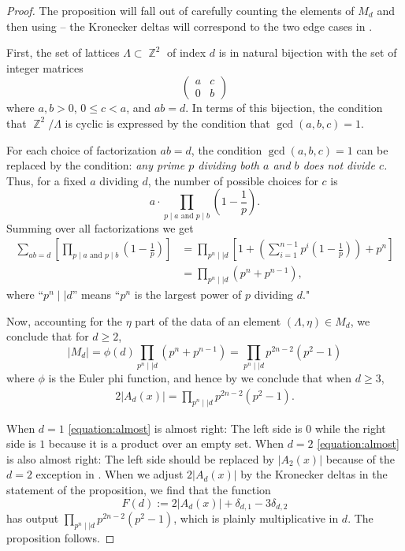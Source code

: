 \documentclass[reqno, 11pt]{amsart}
\DeclareMathOperator{\Z}{\mathbb{Z}}
\begin{document}
\begin{proof}
    The proposition will fall out of carefully counting the elements of $M_{d}$ and then using  -- the Kronecker deltas will correspond to the two edge cases in . 
    
    First, the set of lattices $\Lambda \subset \Z^{2}$ of index $d$ is in natural bijection with the set of integer matrices \[\begin{pmatrix}
        a & c \\
        0 & b
    \end{pmatrix}\] where $a,b > 0$, $0 \leq c < a$, and $ab=d$. In terms of this bijection, the condition that $\Z^{2}/\Lambda$ is cyclic is expressed by the condition that $\gcd(a,b,c)=1$. 

    For each choice of factorization $ab=d$, the condition $\gcd(a,b,c)=1$ can be replaced by the condition: \emph{any prime $p$ dividing both $a$ and $b$ does not divide $c$.} Thus, for a fixed $a$ dividing $d$, the number of possible choices for $c$ is \[ a \cdot \prod_{p \mid a \,\, \text{and} \,\, p \mid b}\left(1 - \frac{1}{p} \right).\] Summing over all factorizations we get 
    \begin{align*}
    \sum_{ab=d}\left[ \prod_{p \mid a \,\, \text{and} \,\, p \mid b}\left(1 - \frac{1}{p} \right) \right] &= \prod_{p^{n}\mid \mid d}\left[1 + \left( \sum_{i=1}^{n-1}p^{i}\left(1-\frac{1}{p}\right) \right) + p^{n} \right]\\
    &= \prod_{p^{n} \mid \mid d}(p^{n}+p^{n-1}),
    \end{align*}
    where ``$p^{n} \mid \mid d$'' means ``$p^{n}$ is the largest power of $p$ dividing $d$."

    Now, accounting for the $\eta$ part of the data of an element $(\Lambda,\eta) \in M_{d}$, we conclude that for $d \geq 2$, \[|M_{d}| = \phi(d)\prod_{p^{n} \mid \mid d}(p^{n}+p^{n-1}) = \prod_{p^{n} \mid \mid d}p^{2n-2}(p^{2}-1)\] where $\phi$ is the Euler phi function, and hence by  we conclude that when $d \geq 3$, 
    \begin{align}
    \label{equation:almost}
    2|A_{d}(x)| = \prod_{p^{n} \mid \mid d}p^{2n-2}(p^{2}-1).
    \end{align}

    When $d=1$ \eqref{equation:almost} is almost right: The left side is $0$ while the right side is $1$ because it is a product over an empty set.  When $d=2$ \eqref{equation:almost} is also almost right: The left side should be replaced by $|A_{2}(x)|$ because of the $d=2$ exception in .  When we adjust $2 | A_{d}(x)|$ by the Kronecker deltas in the statement of the proposition, we find that the function \[F(d) := 2|A_{d}(x)|+\delta_{d,1}-3\delta_{d,2}\] has output $\prod_{p^{n} \mid \mid d}p^{2n-2}(p^{2}-1)$, which is plainly multiplicative in $d$. The proposition follows.
\end{proof}
\end{document}
